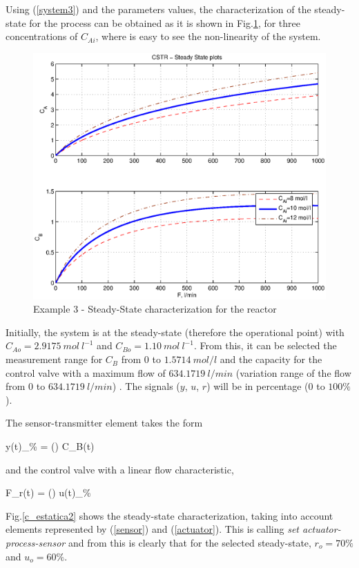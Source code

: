 Using (\ref{system3}) and the parameters values, the
characterization of the steady-state for the process can be
obtained as it is shown in Fig.\ref{c_estatica}, for three
concentrations of $C_{Ai}$, where is easy to see the non-linearity
of the system.

\begin{figure}[htb!]
    \begin{center}
        \includegraphics[width=0.7\linewidth]{c_estatica.eps}
        \caption{Example 3 - Steady-State characterization for the reactor}
        \label{c_estatica}
    \end{center}
\end{figure}

Initially, the system is at the steady-state (therefore the
operational point) with $C_{Ao} = 2.9175 \ mol \ l^{-1}$ and
$C_{Bo} = 1.10 \ mol \ l^{-1}$. From this, it can be selected the
measurement range for $C_B$ from $0$ to $1.5714 \ mol/l$ and the
capacity for the control valve with a maximum flow of $634.1719 \
l/min$ (variation range of the flow from $0$ to $634.1719 \
l/min$) \cite{arrietaETFA2008}. The signals ($y$, $u$, $r$) will
be in percentage ($0$ to $100\%$).

The sensor-transmitter element takes the form

\be
    y(t)_{\%} = \left(\right) C_B(t) \label{sensor}
\ee

\noindent and the control valve with a linear flow characteristic,

\be
    F_r(t) = \left(\right) u(t)_{\%} \label{actuator}
\ee

Fig.\ref{c_estatica2} shows the steady-state characterization,
taking into account elements represented by (\ref{sensor}) and
(\ref{actuator}). This is calling \emph{set
actuator-process-sensor} and from this is clearly that for the
selected steady-state, $r_o = 70 \%$ and $u_o = 60 \%$.

